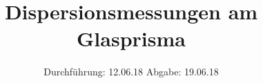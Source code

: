 

\subject{V704}
\title{Dispersionsmessungen am Glasprisma}
\date{%
  Durchführung: 12.06.18
  \hspace{3em}
  Abgabe: 19.06.18
}



\maketitle
\thispagestyle{empty}
\tableofcontents
\newpage





\printbibliography{}


